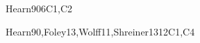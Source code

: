 \begin{syllabus}
\begin{unit}{\GVFundamentalConcepts}{}{Hearn90}{6}{C1,C2}
    \begin{topics}
    	\item \GVFundamentalConceptsTopicMedia
    	\item \GVFundamentalConceptsTopicTradeoffs
    	\item \GVFundamentalConceptsTopicAdditive             
    	\item \GVFundamentalConceptsTopicAnimation
    \end{topics}

    \begin{learningoutcomes}
    	\item \GVFundamentalConceptsLOExplainIn [\Familiarity]
    	\item \GVFundamentalConceptsLODescribeColor [\Familiarity]
    	\item \GVFundamentalConceptsLODescribeTheStoring [\Familiarity] 
    	\item \GVFundamentalConceptsLODescribeTheOfMotion [\Familiarity]
    \end{learningoutcomes}
\end{unit}

\begin{unit}{\GVBasicRendering}{}{Hearn90,Foley13,Wolff11,Shreiner13}{12}{C1,C4}
   \begin{topics} 
        \item \GVBasicRenderingTopicRendering
        \item \GVBasicRenderingTopicForward 
        \item \GVBasicRenderingTopicBasic
        \item \GVBasicRenderingTopicAffine 
        \item \GVBasicRenderingTopicRay 
        \item \GVBasicRenderingTopicVisibility 
        \item \GVBasicRenderingTopicSimple 
        \item \GVBasicRenderingTopicRenderingWith 
        \item \GVBasicRenderingTopicApplication 
        \item \GVBasicRenderingTopicSampling 
        \item \GVBasicRenderingTopicForward 
   \end{topics}


\end{unit}
\end{syllabus}
